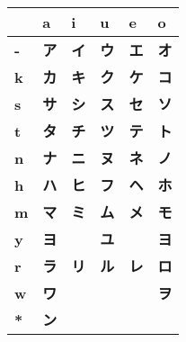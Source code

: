 


\newcommand{\sbf}[1]{\smallskip\textbf{#1}}

\bigskip
\begin{center}	
\Huge


\begin{tabular}{m{1.0cm}||m{1.0cm}|m{1.0cm}|m{1.0cm}|m{1.0cm}|m{1.0cm}|}
& \textbf{a}& \textbf{i}& \textbf{u}& \textbf{e}& \textbf{o}\\ \hline \hline 
\textbf{-}&\sbf{ア}&\sbf{イ}&\sbf{ウ}&\sbf{エ}&\sbf{オ}\\ \hline 
\textbf{k}&\sbf{カ}&\sbf{キ}&\sbf{ク}&\sbf{ケ}&\sbf{コ}\\ \hline 
\textbf{s}&\sbf{サ}&\sbf{シ}&\sbf{ス}&\sbf{セ}&\sbf{ソ}\\ \hline 
\textbf{t}&\sbf{タ}&\sbf{チ}&\sbf{ツ}&\sbf{テ}&\sbf{ト}\\ \hline 
\textbf{n}&\sbf{ナ}&\sbf{ニ}&\sbf{ヌ}&\sbf{ネ}&\sbf{ノ}\\ \hline 
\textbf{h}&\sbf{ハ}&\sbf{ヒ}&\sbf{フ}&\sbf{ヘ}&\sbf{ホ}\\ \hline 
\textbf{m}&\sbf{マ}&\sbf{ミ}&\sbf{ム}&\sbf{メ}&\sbf{モ}\\ \hline 
\textbf{y}&\sbf{ヨ}&\sbf{  }&\sbf{ユ}&\sbf{  }&\sbf{ヨ}\\ \hline 
\textbf{r}&\sbf{ラ}&\sbf{リ}&\sbf{ル}&\sbf{レ}&\sbf{ロ}\\ \hline 
\textbf{w}&\sbf{ワ}&\sbf{  }&\sbf{  }&\sbf{  }&\sbf{ヲ}\\ \hline 
\textbf{*}&\sbf{ン}&\sbf{  }&\sbf{  }&\sbf{  }&\sbf{  }\\ \hline 
\end{tabular}
\end{center}
